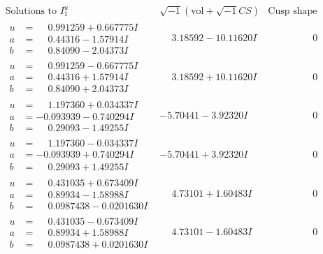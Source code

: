 \documentclass[1p]{elsarticle_modified}
\theoremstyle{definition}
\newcommand{\I}{\sqrt{-1}}
\begin{document}
$$\begin{array}{c|c|c}
\text{Solutions to }I^u_{1}& \I (\text{vol} + \sqrt{-1}CS) & \text{Cusp shape}\\
 \hline 
\begin{aligned}
u &= \phantom{-}0.991259 + 0.667775 I \\
a &= \phantom{-}0.44316 - 1.57914 I \\
b &= \phantom{-}0.84090 - 2.04373 I\end{aligned}
 & \phantom{-}3.18592 - 10.11620 I & \phantom{-0.000000 } 0 \\ \hline\begin{aligned}
u &= \phantom{-}0.991259 - 0.667775 I \\
a &= \phantom{-}0.44316 + 1.57914 I \\
b &= \phantom{-}0.84090 + 2.04373 I\end{aligned}
 & \phantom{-}3.18592 + 10.11620 I & \phantom{-0.000000 } 0 \\ \hline\begin{aligned}
u &= \phantom{-}1.197360 + 0.034337 I \\
a &= -0.093939 - 0.740294 I \\
b &= \phantom{-}0.29093 - 1.49255 I\end{aligned}
 & -5.70441 - 3.92320 I & \phantom{-0.000000 } 0 \\ \hline\begin{aligned}
u &= \phantom{-}1.197360 - 0.034337 I \\
a &= -0.093939 + 0.740294 I \\
b &= \phantom{-}0.29093 + 1.49255 I\end{aligned}
 & -5.70441 + 3.92320 I & \phantom{-0.000000 } 0 \\ \hline\begin{aligned}
u &= \phantom{-}0.431035 + 0.673409 I \\
a &= \phantom{-}0.89934 - 1.58988 I \\
b &= \phantom{-}0.0987438 - 0.0201630 I\end{aligned}
 & \phantom{-}4.73101 + 1.60483 I & \phantom{-0.000000 } 0 \\ \hline\begin{aligned}
u &= \phantom{-}0.431035 - 0.673409 I \\
a &= \phantom{-}0.89934 + 1.58988 I \\
b &= \phantom{-}0.0987438 + 0.0201630 I\end{aligned}
 & \phantom{-}4.73101 - 1.60483 I & \phantom{-0.000000 } 0 \\ \hline\begin{aligned}

\end{aligned}
\end{array}$$
\end{document}
